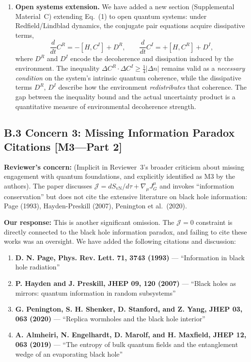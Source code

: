 \documentclass[11pt,a4paper]{article}
\begin{document}
\begin{enumerate}[leftmargin=*]
\item \textbf{Open systems extension.} We have added a new section (Supplemental Material~C) extending Eq.~(1) to open quantum systems: under Redfield/Lindblad dynamics, the conjugate pair equations acquire dissipative terms,
\begin{equation}
\frac{d}{dt}C^R = -[H, C^I] + D^R, \qquad \frac{d}{dt}C^I = +[H, C^R] + D^I,
\end{equation}
where $D^R$ and $D^I$ encode the decoherence and dissipation induced by the environment. The inequality $\Delta C^R \cdot \Delta C^I \geq \frac{1}{4}|\Delta n|$ remains valid as a \emph{necessary condition} on the system's intrinsic quantum coherence, while the dissipative terms $D^R$, $D^I$ describe how the environment \emph{redistributes} that coherence. The gap between the inequality bound and the actual uncertainty product is a quantitative measure of environmental decoherence strength.
\end{enumerate}

\subsection*{B.3 Concern 3: Missing Information Paradox Citations [M3---Part 2]}

\textbf{Reviewer's concern:} (Implicit in Reviewer~3's broader criticism about missing engagement with quantum foundations, and explicitly identified as M3 by the authors). The paper discusses $\mathcal{J} = dS_{\text{vN}}/d\tau + \nabla_\mu J^\mu_G$ and invokes ``information conservation'' but does not cite the extensive literature on black hole information: Page (1993), Hayden-Preskill (2007), Penington et al.\ (2020).

\textbf{Our response:} This is another significant omission. The $\mathcal{J}=0$ constraint is directly connected to the black hole information paradox, and failing to cite these works was an oversight. We have added the following citations and discussion:

\begin{enumerate}[leftmargin=*]
\item \textbf{D. N. Page, Phys. Rev. Lett. 71, 3743 (1993)} --- ``Information in black hole radiation''
\item \textbf{P. Hayden and J. Preskill, JHEP 09, 120 (2007)} --- ``Black holes as mirrors: quantum information in random subsystems''
\item \textbf{G. Penington, S. H. Shenker, D. Stanford, and Z. Yang, JHEP 03, 063 (2020)} --- ``Replica wormholes and the black hole interior''
\item \textbf{A. Almheiri, N. Engelhardt, D. Marolf, and H. Maxfield, JHEP 12, 063 (2019)} --- ``The entropy of bulk quantum fields and the entanglement wedge of an evaporating black hole''
\end{enumerate}
\end{document}
